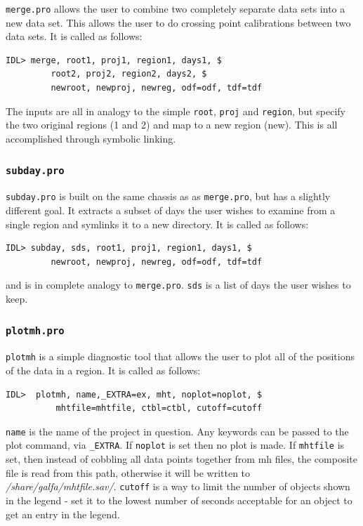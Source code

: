 \documentclass[11pt]{article}
\begin{document}
{\texttt{merge.pro} allows the user to combine two completely separate data sets into a new data set. This allows the user to do crossing point calibrations between two data sets. It is called as follows:
\begin{verbatim}
IDL> merge, root1, proj1, region1, days1, $
         root2, proj2, region2, days2, $
         newroot, newproj, newreg, odf=odf, tdf=tdf
\end{verbatim}
The inputs are all in analogy to the simple \texttt{root}, \texttt{proj} and \texttt{region}, but specify the two original regions (1 and 2) and map to a new region (new). This is all accomplished through symbolic linking. 

\subsubsection{\texttt{subday.pro}}
\texttt{subday.pro} is built on the same chassis as as \texttt{merge.pro}, but has a slightly different goal. It extracts a subset of days the user wishes to examine from a single region and symlinks it to a new directory. It is called as follows:
\begin{verbatim}
IDL> subday, sds, root1, proj1, region1, days1, $
         newroot, newproj, newreg, odf=odf, tdf=tdf
\end{verbatim}
and is in complete analogy to \texttt{merge.pro}. \texttt{sds} is a list of days the user wishes to keep. 

\subsubsection{\texttt{plotmh.pro}}
\texttt{plotmh} is a simple diagnostic tool that allows the user to plot all of the positions of the data in a region. It is called as follows:
\begin{verbatim}
IDL>  plotmh, name,_EXTRA=ex, mht, noplot=noplot, $
          mhtfile=mhtfile, ctbl=ctbl, cutoff=cutoff
\end{verbatim}
\texttt{name} is the name of the project in question. Any keywords can be passed to the plot command, via \texttt{\_EXTRA}. If \texttt{noplot} is set then no plot is made. If \texttt{mhtfile} is set, then instead of cobbling all data points together from mh files, the composite file is read from this path, otherwise it will be written to {\it /share/galfa/mhtfile.sav/}. \texttt{cutoff} is a way to limit the number of objects shown in the legend - set it to the lowest number of seconds acceptable for an object to get an entry in the legend.

}
\end{document}
